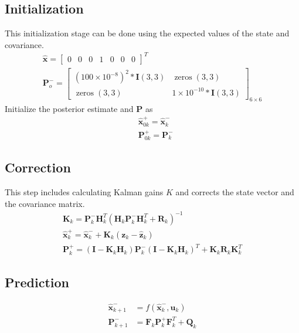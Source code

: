 \subsection{Initialization}
This initialization stage can be done using the expected values of the state and covariance.
$$
\begin{gathered}
\hat{\mathbf{x}}=\left[\begin{array}{lllllll}
0 & 0 & 0 & 1 & 0 & 0 & 0
\end{array}\right]^{T} \\
\mathbf{P}_{o}^{-}=\left[\begin{array}{cc}
\left(100 \times 10^{-8}\right)^{2} * \textbf{I}(3,3) & \operatorname{zeros}(3,3) \\
\operatorname{zeros}(3,3) & 1 \times 10^{-10} * \textbf{I}(3,3)
\end{array}\right]_{6 \times 6}
\end{gathered}
$$
Initialize the posterior estimate and $\mathbf{P}$ as 
$$
\begin{aligned}
&\hat{\mathbf{x}}_{0 k}^{+}=\hat{\mathbf{x}}_{k}^{-} \\
&\mathbf{P}_{0 k}^{+}=\mathbf{P}_{k}^{-}
\end{aligned}
$$

\subsection{Correction}
This step includes calculating Kalman gains $K$ and corrects the state vector and the covariance matrix.
$$
\begin{gathered}
\mathbf{K}_{k}=\mathbf{P}_{k}^{-} \mathbf{H}_{k}^{T}\left(\mathbf{H}_{k} \mathbf{P}_{k}^{-} \mathbf{H}_{k}^{T}+\mathbf{R}_{k}\right)^{-1} \\
\mathbf{\hat{x}}_{k}^{+}=\mathbf{\hat{x}}_{k}^{-}+\mathbf{K}_{k}\left(\mathbf{z}_{k}-\mathbf{\hat{z}}_{k}\right) \\
\mathbf{P}_{k}^{+}=\left(\mathbf{I}-\mathbf{K}_{k} \mathbf{H}_{k}\right) \mathbf{P}_{k}^{-}\left(\mathbf{I}-\mathbf{K}_{k} \mathbf{H}_{k}\right)^{T}+\mathbf{K}_{k} \mathbf{R}_{k} \mathbf{K}_{k}^{T}
\end{gathered}
$$

\subsection{Prediction}
\begin{align}
\mathbf{\hat{x}}_{k+1}^{-}&=f\left(\mathbf{\hat{x}}_{k}^{-}, \mathbf{u}_{k}\right) \\
\mathbf{P}_{k+1}^{-}&=\mathbf{F}_{k} \mathbf{P}_{k}^{+} \mathbf{F}_{k}^{T}+\mathbf{Q}_{k}
\end{align}

